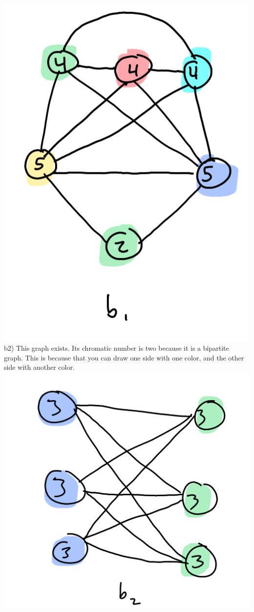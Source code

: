 \documentclass{article}
\begin{document}
\begin{solution}
	\\ \includegraphics[scale=0.4]{b1.png}
	\\
	b2) This graph exists. Its chromatic number is two because it is a bipartite graph. This is because that you can draw one side with one color, and the other side with another color.
	\\ \includegraphics[scale=0.3]{b2.png}


	
\end{solution}
\end{document}
